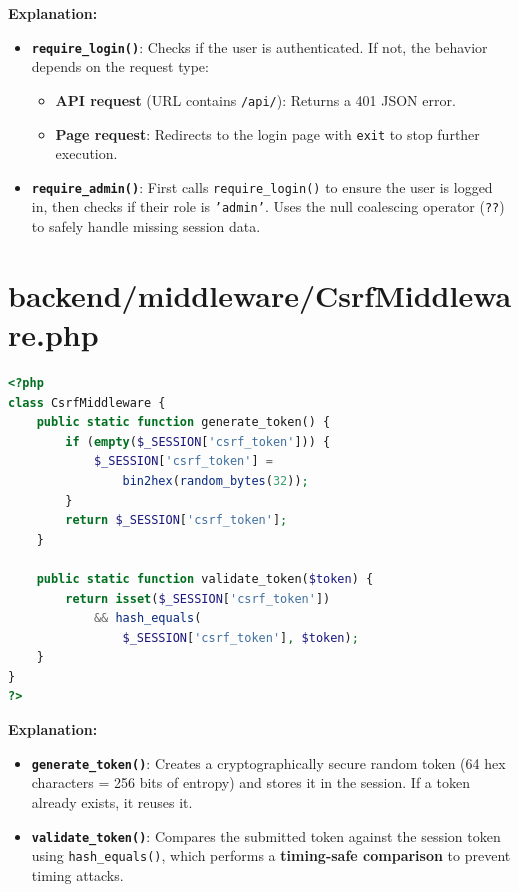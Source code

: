 \documentclass[12pt,a4paper]{report}
\begin{document}
\textbf{Explanation:}
\begin{itemize}
    \item \textbf{\texttt{require\_login()}}: Checks if the user is authenticated. If not, the behavior depends on the request type:
    \begin{itemize}
        \item \textbf{API request} (URL contains \texttt{/api/}): Returns a 401 JSON error.
        \item \textbf{Page request}: Redirects to the login page with \texttt{exit} to stop further execution.
    \end{itemize}
    \item \textbf{\texttt{require\_admin()}}: First calls \texttt{require\_login()} to ensure the user is logged in, then checks if their role is \texttt{'admin'}. Uses the null coalescing operator (\texttt{??}) to safely handle missing session data.
\end{itemize}

\section{backend/middleware/CsrfMiddleware.php}

\begin{lstlisting}[language=PHP]
<?php
class CsrfMiddleware {
    public static function generate_token() {
        if (empty($_SESSION['csrf_token'])) {
            $_SESSION['csrf_token'] =
                bin2hex(random_bytes(32));
        }
        return $_SESSION['csrf_token'];
    }

    public static function validate_token($token) {
        return isset($_SESSION['csrf_token'])
            && hash_equals(
                $_SESSION['csrf_token'], $token);
    }
}
?>
\end{lstlisting}

\textbf{Explanation:}
\begin{itemize}
    \item \textbf{\texttt{generate\_token()}}: Creates a cryptographically secure random token (64 hex characters = 256 bits of entropy) and stores it in the session. If a token already exists, it reuses it.
    \item \textbf{\texttt{validate\_token()}}: Compares the submitted token against the session token using \texttt{hash\_equals()}, which performs a \textbf{timing-safe comparison} to prevent timing attacks.
\end{itemize}
\end{document}
